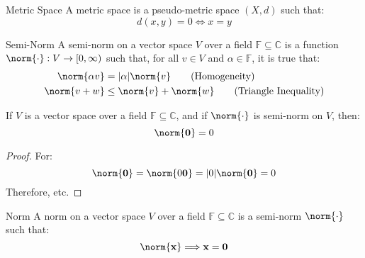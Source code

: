 \documentclass[crop=false,class=article,oneside]{standalone}
\begin{document}
            \begin{ldefinition}{Metric Space}
                A metric space is a pseudo-metric space $(X,d)$
                such that:
                \begin{equation}
                    d(x,y)=0\Longleftrightarrow{x}=y
                    \tag{Definiteness}
                \end{equation}
            \end{ldefinition}
            \begin{ldefinition}{Semi-Norm}
                A semi-norm on a vector space $V$ over a field
                $\mathbb{F}\subseteq\mathbb{C}$ is a function
                $\norm{\cdot}:V\rightarrow[0,\infty)$ such that, for
                all $v\in{V}$ and $\alpha\in\mathbb{F}$,
                it is true that:
                \begin{align}
                    \norm{\alpha{v}}
                    &=|\alpha|\norm{v}
                    \tag{Homogeneity}\\
                    \norm{v+w}
                    &\leq\norm{v}+\norm{w}
                    \tag{Triangle Inequality}
                \end{align}
            \end{ldefinition}
            \begin{theorem}
                If $V$ is a vector space over a field
                $\mathbb{F}\subseteq\mathbb{C}$, and if
                $\norm{\cdot}$ is semi-norm on $V$, then:
                \begin{equation}
                    \norm{\mathbf{0}}=0
                \end{equation}
            \end{theorem}
            \begin{proof}
                For:
                \begin{equation}
                    \norm{\mathbf{0}}
                    =\norm{0\mathbf{0}}
                    =|0|\norm{\mathbf{0}}=0
                \end{equation}
                Therefore, etc.
            \end{proof}
            \begin{ldefinition}{Norm}
                A norm on a vector space $V$ over a
                field $\mathbb{F}\subseteq\mathbb{C}$
                is a semi-norm $\norm{\cdot}$ such that:
                \begin{equation}
                    \norm{\mathbf{x}}\Longrightarrow\mathbf{x}
                    =\mathbf{0}
                \end{equation}
            \end{ldefinition}
\end{document}
